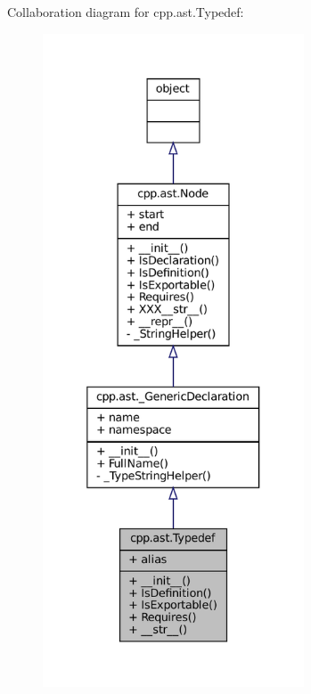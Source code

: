 Collaboration diagram for cpp.\+ast.\+Typedef\+:
\nopagebreak
\begin{figure}[H]
\begin{center}
\leavevmode
\includegraphics[height=550pt]{classcpp_1_1ast_1_1Typedef__coll__graph}
\end{center}
\end{figure}
